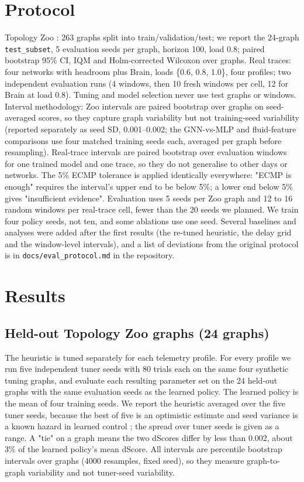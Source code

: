 \documentclass[journal]{IEEEtran}
\begin{document}
\section{Protocol}
\label{sec:5}
Topology Zoo \cite{r23}: 263 graphs split into train/validation/test; we report the 24-graph \texttt{test\_subset}, 5 evaluation seeds per graph, horizon 100, load 0.8; paired bootstrap 95\% CI, IQM \cite{r24} and Holm-corrected Wilcoxon over graphs. Real traces: four networks with headroom plus Brain, loads \{0.6, 0.8, 1.0\}, four profiles; two independent evaluation runs (4 windows, then 10 fresh windows per cell, 12 for Brain at load 0.8). Tuning and model selection never use test graphs or windows. Interval methodology: Zoo intervals are paired bootstrap over graphs on seed-averaged scores, so they capture graph variability but not training-seed variability (reported separately as seed SD, 0.001--0.002; the GNN-vs-MLP and fluid-feature comparisons use four matched training seeds each, averaged per graph before resampling). Real-trace intervals are paired bootstrap over evaluation windows for one trained model and one trace, so they do not generalise to other days or networks. The 5\% ECMP tolerance is applied identically everywhere: "ECMP is enough" requires the interval's upper end to be below 5\%; a lower end below 5\% gives "insufficient evidence". Evaluation uses 5 seeds per Zoo graph and 12 to 16 random windows per real-trace cell, fewer than the 20 seeds we planned. We train four policy seeds, not ten, and some ablations use one seed. Several baselines and analyses were added after the first results (the re-tuned heuristic, the delay grid and the window-level intervals), and a list of deviations from the original protocol is in \texttt{docs/eval\_protocol.md} in the repository.

\section{Results}
\label{sec:6}
\subsection{Held-out Topology Zoo graphs (24 graphs)}
\label{sec:6.1}
The heuristic is tuned separately for each telemetry profile. For every profile we run five independent tuner seeds with 80 trials each on the same four synthetic tuning graphs, and evaluate each resulting parameter set on the 24 held-out graphs with the same evaluation seeds as the learned policy. The learned policy is the mean of four training seeds. We report the heuristic averaged over the five tuner seeds, because the best of five is an optimistic estimate and seed variance is a known hazard in learned control \cite{r25}; the spread over tuner seeds is given as a range. A "tie" on a graph means the two dScores differ by less than 0.002, about 3\% of the learned policy's mean dScore. All intervals are percentile bootstrap intervals over graphs (4000 resamples, fixed seed), so they measure graph-to-graph variability and not tuner-seed variability.
\end{document}
